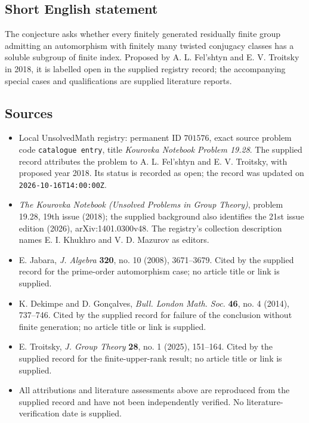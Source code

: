 \documentclass[11pt]{article}
\begin{document}
\subsection{Short English statement}
The conjecture asks whether every finitely generated residually finite group admitting an automorphism with finitely many twisted conjugacy classes has a soluble subgroup of finite index. Proposed by A. L. Fel'shtyn and E. V. Troitsky in 2018, it is labelled open in the supplied registry record; the accompanying special cases and qualifications are supplied literature reports.
\subsection{Sources}
\begin{itemize}
\item Local UnsolvedMath registry: permanent ID \(701576\), exact source problem code \texttt{catalogue entry}, title \emph{Kourovka Notebook Problem 19.28}. The supplied record attributes the problem to A. L. Fel'shtyn and E. V. Troitsky, with proposed year 2018. Its status is recorded as open; the record was updated on \texttt{2026-10-16T14:00:00Z}.
\item \emph{The Kourovka Notebook (Unsolved Problems in Group Theory)}, problem 19.28, 19th issue (2018); the supplied background also identifies the 21st issue edition (2026), arXiv:1401.0300v48. The registry's collection description names E. I. Khukhro and V. D. Mazurov as editors.
\item E. Jabara, \emph{J. Algebra} \textbf{320}, no. 10 (2008), 3671--3679. Cited by the supplied record for the prime-order automorphism case; no article title or link is supplied.
\item K. Dekimpe and D. Gonçalves, \emph{Bull. London Math. Soc.} \textbf{46}, no. 4 (2014), 737--746. Cited by the supplied record for failure of the conclusion without finite generation; no article title or link is supplied.
\item E. Troitsky, \emph{J. Group Theory} \textbf{28}, no. 1 (2025), 151--164. Cited by the supplied record for the finite-upper-rank result; no article title or link is supplied.
\item All attributions and literature assessments above are reproduced from the supplied record and have not been independently verified. No literature-verification date is supplied.
\end{itemize}
\end{document}
